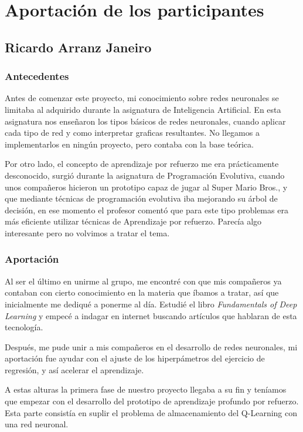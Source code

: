 \chapter{Aportación de los participantes}

\section{Ricardo Arranz Janeiro}
\subsection{Antecedentes}
Antes de comenzar este proyecto, mi conocimiento sobre redes neuronales se limitaba al adquirido durante la asignatura de Inteligencia Artificial. En esta asignatura nos enseñaron los tipos básicos de redes neuronales, cuando aplicar cada tipo de red y como interpretar graficas resultantes. No llegamos a implementarlos en ningún proyecto, pero contaba con la base teórica.

Por otro lado, el concepto de aprendizaje por refuerzo me era prácticamente desconocido, surgió durante la asignatura de Programación Evolutiva, cuando unos compañeros hicieron un prototipo capaz de jugar al Super Mario Bros., y que mediante técnicas de programación evolutiva iba mejorando su árbol de decisión, en ese momento el profesor comentó que para este tipo problemas era más eficiente utilizar técnicas de Aprendizaje por refuerzo. Parecía algo interesante pero no volvimos a tratar el tema. 

\subsection{Aportación} 
Al ser el último en unirme al grupo, me encontré con que mis compañeros ya contaban con cierto conocimiento en la materia que íbamos a tratar, así que inicialmente me dediqué a ponerme al día. Estudié el libro \textit{Fundamentals of Deep Learning} \citep{Buduma:general} y empecé a indagar en internet buscando artículos que hablaran de esta tecnología. 

Después, me pude unir a mis compañeros en el desarrollo de redes neuronales, mi aportación fue ayudar con el ajuste de los hiperpámetros del ejercicio de regresión, y así acelerar el aprendizaje.

A estas alturas la primera fase de nuestro proyecto llegaba a su fin y teníamos que empezar con el desarrollo del prototipo de aprendizaje profundo por refuerzo. Esta parte consistía en suplir el problema de almacenamiento del Q-Learning con una red neuronal.

